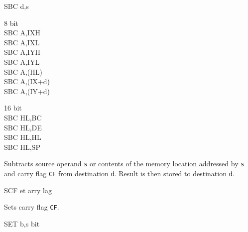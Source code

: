 \documentclass[12pt,twoside,openright,a4paper]{book}
\begin{document}
\begin{basedescript}{
	\desclabelstyle{\multilinelabel}
	\desclabelwidth{3cm}}
\begin{DetailItem}{SBC d,s}
\begin{DetailVariants}
			\columnbreak
			\textnormal{8 bit}\\
			SBC A,IXH\UNDOC\\
			SBC A,IXL\UNDOC\\
			SBC A,IYH\UNDOC\\
			SBC A,IYL\UNDOC\\
			SBC A,(HL)\\
			SBC A,(IX+d)\\
			SBC A,(IY+d)

			\columnbreak
			\textnormal{16 bit}\\
			SBC HL,BC\\
			SBC HL,DE\\
			SBC HL,HL\\
			SBC HL,SP
		\end{DetailVariants}
		
		Subtracts source operand {\tt s} or contents of the memory location addressed by {\tt s} and carry flag {\tt CF} from destination {\tt d}. Result is then stored to destination {\tt d}.

		\begin{DetailEffects}[v]
			\FlagsSBCr[8-bit]
			\FlagsSBCrr[16-bit]
		\end{DetailEffects}
						
		\begin{DetailTiming}
		\end{DetailTiming}

	\end{DetailItem}

	\begin{DetailItem}{SCF}
		{et arry \IH{F}lag}
		{\SymSCF}

		Sets carry flag {\tt CF}.

		\begin{DetailEffects}
			\FlagsSCF
		\end{DetailEffects}
						
		\begin{DetailTiming}
			\DetailTime{1}{4}
		\end{DetailTiming}

	\end{DetailItem}

	\pagebreak
	\begin{DetailItem}{SET b,s}
		{ bit}
		{\SymSET{s}}


\end{DetailItem}
\end{basedescript}
\end{document}
